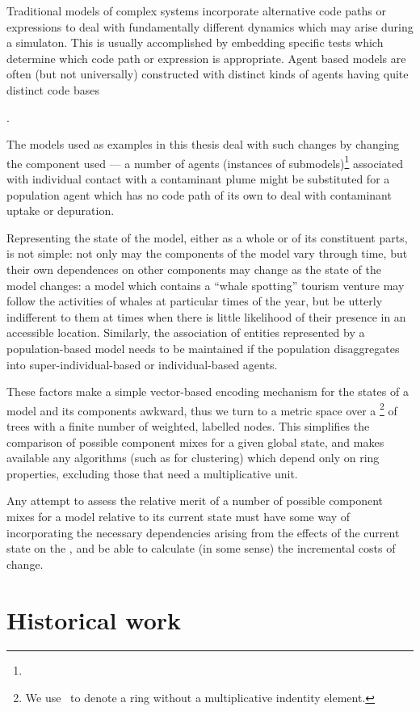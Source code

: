 Traditional models of complex systems incorporate alternative code
paths or expressions to deal with fundamentally different dynamics
which may arise during a simulaton. This is usually accomplished by
embedding specific tests which determine which code path or expression
is appropriate.  Agent based models are often (but not universally)
constructed with distinct kinds of agents having quite distinct code
bases {\citep{netlogo,swarm,repast,mason,nws,ningaloo}.


The models used as examples in this thesis
deal with such changes by changing the component used --- a number of
agents (instances of submodels)\footnote{}
associated with individual contact with a contaminant plume might be
substituted for a population agent which has no code path of its own
to deal with contaminant uptake or depuration.

Representing the state of the model, either as a whole or of its
constituent parts, is not simple: not only may the components of the
model vary through time, but their own dependences on other components
may change as the state of the model changes: a model which contains a
``whale spotting'' tourism venture may follow the activities of whales
at particular times of the year, but be utterly indifferent to them at
times when there is little likelihood of their presence in an
accessible location. Similarly, the association of entities
represented by a population-based model needs to be maintained if the
population disaggregates into super-individual-based or
individual-based agents.

These factors make a simple vector-based encoding mechanism for the
states of a model and its components awkward, thus we turn to a metric
space over a \rng\footnote{We use \rng\ to denote a ring without a
  multiplicative indentity element.} of trees with a finite number of
weighted, labelled nodes. This simplifies the comparison of possible
component mixes for a given global state, and makes available any
algorithms (such as for clustering) which depend only on ring
properties, excluding those that need a multiplicative unit.

Any attempt to assess the relative merit of a number of possible
component mixes for a model relative to its current state must have
some way of incorporating the necessary dependencies arising from the
effects of the current state on the , and be able to calculate (in
some sense) the incremental costs of change.


\section{Historical work}

}
